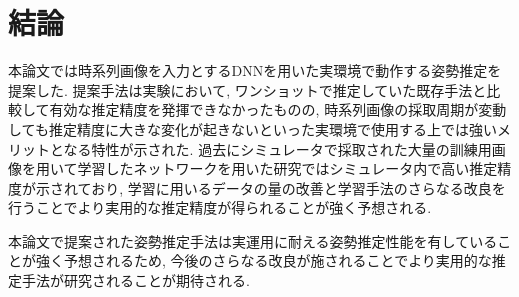 \chapter{結論}
本論文では時系列画像を入力とするDNNを用いた実環境で動作する姿勢推定を提案した. 提案手法は実験において, ワンショットで推定していた既存手法と比較して有効な推定精度を発揮できなかったものの, 時系列画像の採取周期が変動しても推定精度に大きな変化が起きないといった実環境で使用する上では強いメリットとなる特性が示された. 過去にシミュレータで採取された大量の訓練用画像を用いて学習したネットワークを用いた研究ではシミュレータ内で高い推定精度が示されており, 学習に用いるデータの量の改善と学習手法のさらなる改良を行うことでより実用的な推定精度が得られることが強く予想される. \par
本論文で提案された姿勢推定手法は実運用に耐える姿勢推定性能を有していることが強く予想されるため, 今後のさらなる改良が施されることでより実用的な推定手法が研究されることが期待される.